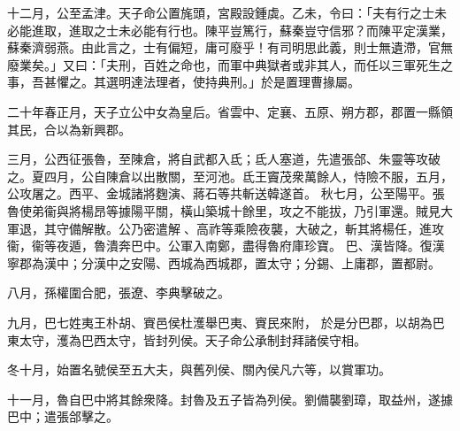 \begin{pinyinscope}
十二月，公至孟津。天子命公置旄頭，宮殿設鍾虡。乙未，令曰：「夫有行之士未必能進取，進取之士未必能有行也。陳平豈篤行，蘇秦豈守信邪？而陳平定漢業，蘇秦濟弱燕。由此言之，士有偏短，庸可廢乎！有司明思此義，則士無遺滯，官無廢業矣。」又曰：「夫刑，百姓之命也，而軍中典獄者或非其人，而任以三軍死生之事，吾甚懼之。其選明達法理者，使持典刑。」於是置理曹掾屬。


二十年春正月，天子立公中女為皇后。省雲中、定襄、五原、朔方郡，郡置一縣領其民，合以為新興郡。


三月，公西征張魯，至陳倉，將自武都入氐；氐人塞道，先遣張郃、朱靈等攻破之。夏四月，公自陳倉以出散關，至河池。氐王竇茂衆萬餘人，恃險不服，五月，公攻屠之。西平、金城諸將麴演、蔣石等共斬送韓遂首。
秋七月，公至陽平。張魯使弟衞與將楊昂等據陽平關，橫山築城十餘里，攻之不能拔，乃引軍還。賊見大軍退，其守備解散。公乃密遣解𢢼、高祚等乘險夜襲，大破之，斬其將楊任，進攻衞，衞等夜遁，魯潰奔巴中。公軍入南鄭，盡得魯府庫珍寶。
巴、漢皆降。復漢寧郡為漢中；分漢中之安陽、西城為西城郡，置太守；分錫、上庸郡，置都尉。


八月，孫權圍合肥，張遼、李典擊破之。


九月，巴七姓夷王朴胡、賨邑侯杜濩舉巴夷、賨民來附，
於是分巴郡，以胡為巴東太守，濩為巴西太守，皆封列侯。天子命公承制封拜諸侯守相。


冬十月，始置名號侯至五大夫，與舊列侯、關內侯凡六等，以賞軍功。


十一月，魯自巴中將其餘衆降。封魯及五子皆為列侯。劉備襲劉璋，取益州，遂據巴中；遣張郃擊之。



\end{pinyinscope}
